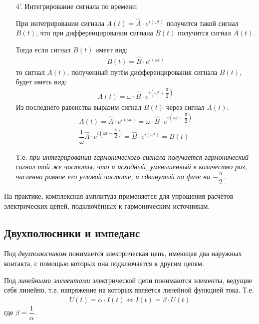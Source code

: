 \documentclass[a4paper, usenames, dvipsnames]{article}
\begin{document}
\begin{enumerate}
    \item[4'.] Интегрирование сигнала по времени:

        При интегрировании сигнала $A(t) = \hat{A} \cdot e^{i(\omega t)}$
        получится такой сигнал $B(t)$, что при дифференцировании сигнала
        $B(t)$ получится сигнал $A(t)$.

        Тогда если сигнал $B(t)$ имеет вид:
        \begin{gather*}
            B(t) = \hat{B} \cdot e^{i(\omega t)}
        \end{gather*}
        то сигнал $A(t)$, полученный путём дифференцирования сигнала $B(t)$,
        будет иметь вид:
        \begin{gather*}
            A(t) = \omega \cdot \hat{B} \cdot e^{i(\omega t + \dfrac{\pi}{2})}
        \end{gather*}
        Из последнего равенства выразим сигнал $B(t)$ через сигнал $A(t)$:
        \begin{gather*}
            A(t) = \hat{A} \cdot e^{i(\omega t)} = \omega \cdot \hat{B} \cdot e^{i(\omega t + \dfrac{\pi}{2})} \\
            \dfrac{1}{\omega} \hat{A} \cdot e^{i\left(\omega t - \dfrac{\pi}{2}\right)} = \hat{B} \cdot e^{i(\omega t)} = B(t)
        \end{gather*}

        Т.е. {\it при интегрировании гармонического сигнала получается
        гармонический сигнал той же частоты, что и исходный,
        уменьшенный в количество раз, численно равное его угловой частоте,
        и сдвинутый по фазе на $-\dfrac{\pi}{2}$}.
\end{enumerate}

На практике, комплексная амплитуда применяется для упрощения расчётов
электрических цепей, подключённых к гармоническим источникам.

\subsection*{Двухполюсники и импеданс}

Под {\it двухполюсником} понимается электрическая цепь,
имеющая два наружных контакта,
с помощью которых она подключается к другим цепям.

Под {\it линейными элементами} электрической цепи понимаются элементы,
ведущие себя линейно, т.е. напряжение на которых является линейной функцией тока.
Т.е.
\begin{gather*}
    U(t) = \alpha \cdot I(t) \Leftrightarrow I(t) = \beta \cdot U(t)
\end{gather*}
где $\beta = \dfrac{1}{\alpha}$.
\end{document}
